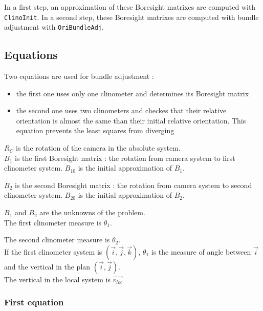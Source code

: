 In a first step, an approximation of these Boresight matrixes are computed with {\tt ClinoInit}. 
In a second step, these Boresight matrixes are computed with bundle adjustment with {\tt OriBundleAdj}.


\subsection{Equations}

Two equations are used for bundle adjustment :
\begin{itemize}
     \item the first one uses only one clinometer and determines its Boresight matrix
     \item the second one uses two clinometers and checkes that their relative orientation is almost the same than their initial relative orientation. 
     This equation prevents the least squares from diverging
\end{itemize}


$R_C$ is the rotation of the camera in the absolute system.\\

$B_1$ is the first Boresight matrix : the rotation from camera system to first clinometer system. $B_{10}$ is the initial approximation of $B_1$.

$B_2$ is the second Boresight matrix : the rotation from camera system to second clinometer system. $B_{20}$ is the initial approximation of $B_2$.

$B_1$ and $B_2$ are the unknowns of the problem.\\

The first clinometer measure is $\theta_1$. 

The second clinometer measure is $\theta_2$. \\

If the first clinometer system is $(\Vec{i}, \Vec{j}, \Vec{k})$, $\theta_1$ is the measure of angle between $\Vec{i}$ and the vertical in the plan $(\Vec{i}, \Vec{j})$.\\

The vertical in the local system is $ \Vec{v_{loc}} $ \\


\subsubsection{First equation}

\label{FirstClinoCalibEq}


